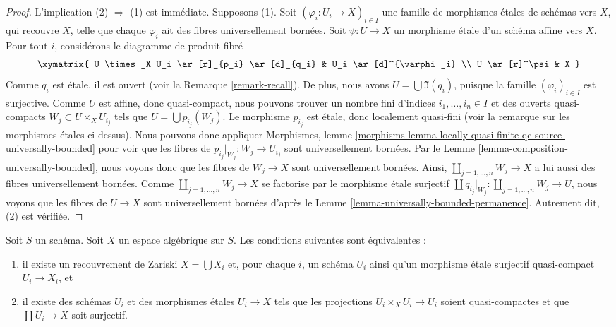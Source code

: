 \begin{proof}
L'implication (2) $\Rightarrow$ (1) est immédiate.
Supposons (1). Soit $(\varphi_i : U_i \to X)_{i \in I}$ une famille de
morphismes étales de schémas vers $X$, qui recouvre $X$, telle que
chaque $\varphi_i$ ait des fibres universellement bornées.
Soit $\psi : U \to X$ un morphisme étale d'un schéma affine vers $X$.
Pour tout $i$, considérons le diagramme de produit fibré
$$
\xymatrix{
U \times_X U_i \ar[r]_{p_i} \ar[d]_{q_i} & U_i \ar[d]^{\varphi_i} \\
U \ar[r]^\psi & X
}
$$
Comme $q_i$ est étale, il est ouvert (voir la Remarque \ref{remark-recall}).
De plus, nous avons $U = \bigcup \Im(q_i)$, puisque la famille
$(\varphi_i)_{i \in I}$ est surjective. Comme $U$ est affine, donc
quasi-compact, nous pouvons trouver un nombre fini d'indices
$i_1, \ldots, i_n \in I$ et des ouverts quasi-compacts
$W_j \subset U \times_X U_{i_j}$ tels que
$U = \bigcup p_{i_j}(W_j)$.
Le morphisme $p_{i_j}$ est étale, donc localement quasi-fini
(voir la remarque sur les morphismes étales ci-dessus). Nous pouvons donc
appliquer Morphismes, lemme
\ref{morphisms-lemma-locally-quasi-finite-qc-source-universally-bounded}
pour voir que les fibres de $p_{i_j}|_{W_j} : W_j \to U_{i_j}$ sont
universellement bornées. Par le
Lemme \ref{lemma-composition-universally-bounded},
nous voyons donc que les fibres de $W_j \to X$ sont universellement bornées.
Ainsi, $\coprod_{j = 1, \ldots, n} W_j \to X$ a lui aussi des fibres
universellement bornées. Comme $\coprod_{j = 1, \ldots, n} W_j \to X$ se
factorise par le morphisme étale surjectif
$\coprod q_{i_j}|_{W_j} : \coprod_{j = 1, \ldots, n} W_j \to U$, nous
voyons que les fibres de $U \to X$ sont universellement bornées d'après le
Lemme \ref{lemma-universally-bounded-permanence}.
Autrement dit, (2) est vérifiée.
\end{proof}

\begin{lemma}
\label{lemma-characterize-very-reasonable}
Soit $S$ un schéma.
Soit $X$ un espace algébrique sur $S$.
Les conditions suivantes sont équivalentes :
\begin{enumerate}
\item il existe un recouvrement de Zariski $X = \bigcup X_i$ et, pour
chaque $i$, un schéma $U_i$ ainsi qu'un morphisme étale surjectif
quasi-compact $U_i \to X_i$, et
\item il existe des schémas $U_i$ et des morphismes étales $U_i \to X$
tels que les projections $U_i \times_X U_i \to U_i$ soient quasi-compactes
et que $\coprod U_i \to X$ soit surjectif.
\end{enumerate}
\end{lemma}


